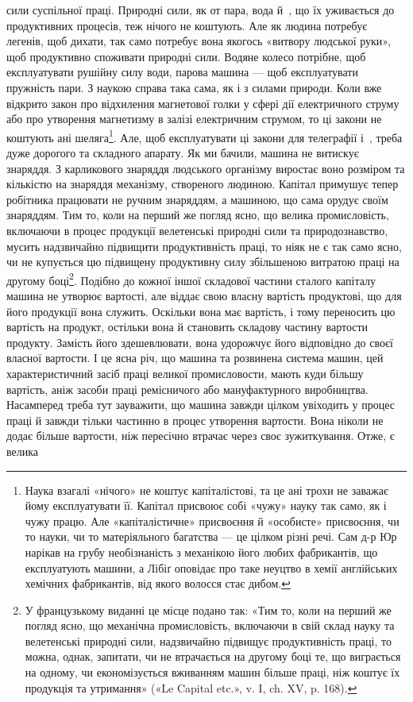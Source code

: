 \parcont{}  %
сили суспільної праці. Природні сили, як от пара, вода й~,
що їх уживається до продуктивних процесів, теж нічого не
коштують. Але як людина потребує легенів, щоб дихати, так само
потребує вона якогось «витвору людської руки», щоб продуктивно
споживати природні сили. Водяне колесо потрібне, щоб
експлуатувати рушійну силу води, парова машина — щоб експлуатувати
пружність пари. З наукою справа така сама, як і з силами
природи. Коли вже відкрито закон про відхилення магнетової
голки у сфері дії електричного струму або про утворення магнетизму
в залізі електричним струмом, то ці закони не коштують
ані шеляга\footnote{
Наука взагалі «нічого» не коштує капіталістові, та це ані трохи
не заважає йому експлуатувати її. Капітал присвоює собі «чужу» науку
так само, як і чужу працю. Але «капіталістичне» присвоєння й «особисте»
присвоєння, чи то науки, чи то матеріяльного багатства — це цілком різні
речі. Сам д-р Юр нарікав на грубу необізнаність з механікою його любих
фабрикантів, що експлуатують машини, а Лібіґ оповідає про таке неуцтво
в хемії англійських хемічних фабрикантів, від якого волосся стає дибом.
}. Але, щоб експлуатувати ці закони для телеграфії
і~, треба дуже дорогого та складного апарату. Як ми бачили,
машина не витискує знаряддя. З карликового знаряддя людського
організму виростає воно розміром та кількістю на знаряддя механізму,
створеного людиною. Капітал примушує тепер робітника
працювати не ручним знаряддям, а машиною, що сама орудує
своїм знаряддям. Тим то, коли на перший же погляд ясно, що
велика промисловість, включаючи в процес продукції велетенські
природні сили та природознавство, мусить надзвичайно
підвищити продуктивність праці, то ніяк не є так само ясно,
чи не купується цю підвищену продуктивну силу збільшеною
витратою праці на другому боці\footnote*{
У французькому виданні це місце подано так: «Тим то, коли на
перший же погляд ясно, що механічна промисловість, включаючи в свій
склад науку та велетенські природні сили, надзвичайно підвищує продуктивність
праці, то можна, однак, запитати, чи не втрачається на другому
боці те, що виграється на одному, чи економізується вживанням
машин більше праці, ніж коштує їх продукція та утримання» («Le Capital
etc.», v. I, ch. XV, p. 168). 
}. Подібно до кожної іншої складової
частини сталого капіталу машина не утворює вартості,
але віддає свою власну вартість продуктові, що для його продукції
вона служить. Оскільки вона має вартість, і тому переносить
цю вартість на продукт, остільки вона й становить складову
частину вартости продукту. Замість його здешевлювати, вона
удорожчує його відповідно до своєї власної вартости. І це ясна
річ, що машина та розвинена система машин, цей характеристичний
засіб праці великої промисловости, мають куди більшу вартість,
аніж засоби праці ремісничого або мануфактурного виробництва.
Насамперед треба тут зауважити, що машина завжди цілком
увіходить у процес праці й завжди тільки частинно в процес
утворення вартости. Вона ніколи не додає більше вартости,
ніж пересічно втрачає через своє зужиткування. Отже, є велика
\parbreak{}  %
